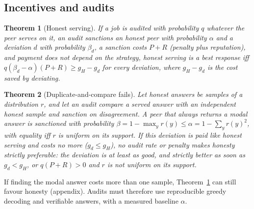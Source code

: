 \documentclass[11pt]{article}
\newtheorem{theorem}{Theorem}
\theoremstyle{definition}
\theoremstyle{remark}
\begin{document}
\subsection{Incentives and audits}
\begin{theorem}[Honest serving]\label{thm:incentive}
If a job is audited with probability $q$ whatever the peer serves on it, an audit sanctions an honest
peer with probability $\alpha$ and a deviation $d$ with probability $\beta_d$, a sanction costs $P+R$
(penalty plus reputation), and payment does not depend on the strategy, honest serving is a best response
iff $q(\beta_d-\alpha)(P+R)\ge g_H-g_d$ for every deviation, where $g_H-g_d$ is the cost saved by deviating.
\end{theorem}
\begin{theorem}[Duplicate-and-compare fails]\label{thm:audit}
Let honest answers be samples of a distribution $r$, and let an audit compare a served answer with an
independent honest sample and sanction on disagreement. A peer that always returns a modal answer is
sanctioned with probability $\beta=1-\max_yr(y)\le\alpha=1-\sum_yr(y)^2$, with equality iff $r$ is uniform on
its support. If this deviation is paid like honest serving and costs no more ($g_d\le g_H$), no audit rate
or penalty makes honesty strictly preferable: the deviation is at least as good, and strictly better as soon
as $g_d<g_H$, or $q(P+R)>0$ and $r$ is not uniform on its support.
\end{theorem}
If finding the modal answer costs more than one sample, Theorem~\ref{thm:incentive} can still favour
honesty (appendix). Audits must therefore use reproducible greedy decoding and verifiable answers, with a
measured baseline $\alpha$.
\end{document}
